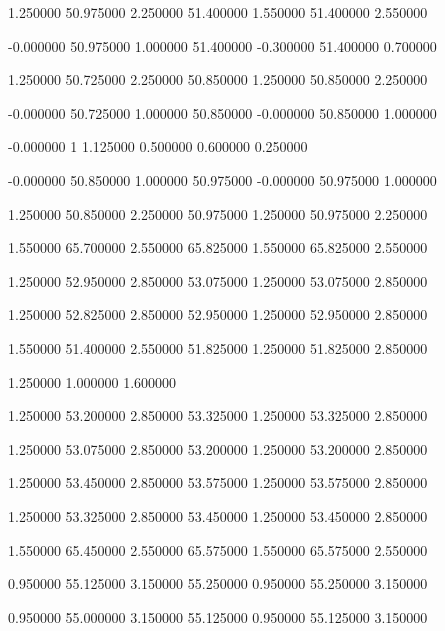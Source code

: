  {1.250000} {50.975000} {2.250000} {51.400000} {1.550000} {51.400000} {2.550000}

 {-0.000000} {50.975000} {1.000000} {51.400000} {-0.300000} {51.400000} {0.700000}

 {1.250000} {50.725000} {2.250000} {50.850000} {1.250000} {50.850000} {2.250000}

 {-0.000000} {50.725000} {1.000000} {50.850000} {-0.000000} {50.850000} {1.000000}

 {-0.000000} {1} {1.125000} {0.500000} {0.600000} {0.250000}

 {-0.000000} {50.850000} {1.000000} {50.975000} {-0.000000} {50.975000} {1.000000}

 {1.250000} {50.850000} {2.250000} {50.975000} {1.250000} {50.975000} {2.250000}

 {1.550000} {65.700000} {2.550000} {65.825000} {1.550000} {65.825000} {2.550000}

 {1.250000} {52.950000} {2.850000} {53.075000} {1.250000} {53.075000} {2.850000}

 {1.250000} {52.825000} {2.850000} {52.950000} {1.250000} {52.950000} {2.850000}

 {1.550000} {51.400000} {2.550000} {51.825000} {1.250000} {51.825000} {2.850000}

 {1.250000} {1.000000} {1.600000}

 {1.250000} {53.200000} {2.850000} {53.325000} {1.250000} {53.325000} {2.850000}

 {1.250000} {53.075000} {2.850000} {53.200000} {1.250000} {53.200000} {2.850000}

 {1.250000} {53.450000} {2.850000} {53.575000} {1.250000} {53.575000} {2.850000}

 {1.250000} {53.325000} {2.850000} {53.450000} {1.250000} {53.450000} {2.850000}

 {1.550000} {65.450000} {2.550000} {65.575000} {1.550000} {65.575000} {2.550000}

 {0.950000} {55.125000} {3.150000} {55.250000} {0.950000} {55.250000} {3.150000}

 {0.950000} {55.000000} {3.150000} {55.125000} {0.950000} {55.125000} {3.150000}

